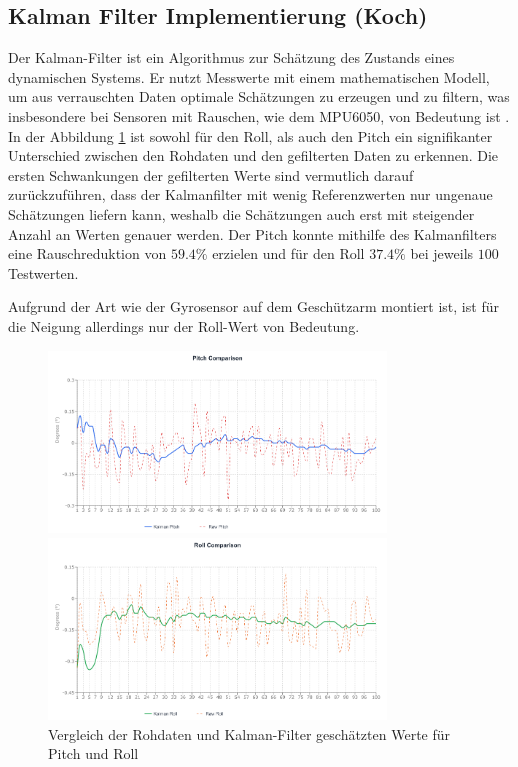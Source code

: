 \begin{samepage}
    \subsection{Kalman Filter Implementierung (Koch)}
    \label{sec:kalman_filter}
    Der Kalman-Filter ist ein Algorithmus zur Schätzung des Zustands eines dynamischen Systems. Er nutzt Messwerte mit einem mathematischen Modell, um aus verrauschten Daten optimale Schätzungen zu erzeugen und zu filtern, was insbesondere bei Sensoren mit Rauschen, wie dem MPU6050, von Bedeutung ist \cite{raspberry_rwth_kalman_2025}.
    In der Abbildung \ref{fig:pitch_roll_vergleich} ist sowohl für den Roll, als auch den Pitch ein signifikanter Unterschied zwischen den Rohdaten und den gefilterten Daten zu erkennen. Die ersten Schwankungen der gefilterten Werte sind vermutlich darauf zurückzuführen, dass der Kalmanfilter mit wenig Referenzwerten nur ungenaue Schätzungen liefern kann, weshalb die Schätzungen auch erst mit steigender Anzahl an Werten genauer werden.
    Der Pitch konnte mithilfe des Kalmanfilters eine Rauschreduktion von $59.4\%$ erzielen und für den Roll $37.4\%$ bei jeweils $100$ Testwerten.

    Aufgrund der Art wie der Gyrosensor auf dem Geschützarm montiert ist, ist für die Neigung allerdings nur der Roll-Wert von Bedeutung.


    \begin{figure}[H]
        \centering
        \includegraphics[width=0.8\textwidth]{images/kalman_comparison_pitch_2025-06-23.png}
        \vspace{1em} 
        
        \includegraphics[width=0.8\textwidth]{images/kalman_comparison_roll_2025-06-23.png}
        
        \caption{Vergleich der Rohdaten und Kalman-Filter geschätzten Werte für Pitch und Roll}
        \label{fig:pitch_roll_vergleich}
    \end{figure}

\end{samepage}


